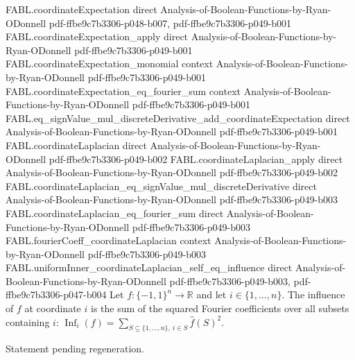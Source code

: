 \begin{theorem}
\proofstep
  {FABL.coordinateExpectation}
  {direct}
  {Analysis-of-Boolean-Functions-by-Ryan-ODonnell}
  {pdf-ffbe9c7b3306-p048-b007,
    pdf-ffbe9c7b3306-p049-b001}
\proofstep
  {FABL.coordinateExpectation_apply}
  {direct}
  {Analysis-of-Boolean-Functions-by-Ryan-ODonnell}
  {pdf-ffbe9c7b3306-p049-b001}
\proofstep
  {FABL.coordinateExpectation_monomial}
  {context}
  {Analysis-of-Boolean-Functions-by-Ryan-ODonnell}
  {pdf-ffbe9c7b3306-p049-b001}
\proofstep
  {FABL.coordinateExpectation_eq_fourier_sum}
  {context}
  {Analysis-of-Boolean-Functions-by-Ryan-ODonnell}
  {pdf-ffbe9c7b3306-p049-b001}
\proofstep
  {FABL.eq_signValue_mul_discreteDerivative_add_coordinateExpectation}
  {direct}
  {Analysis-of-Boolean-Functions-by-Ryan-ODonnell}
  {pdf-ffbe9c7b3306-p049-b001}
\proofstep
  {FABL.coordinateLaplacian}
  {direct}
  {Analysis-of-Boolean-Functions-by-Ryan-ODonnell}
  {pdf-ffbe9c7b3306-p049-b002}
\proofstep
  {FABL.coordinateLaplacian_apply}
  {direct}
  {Analysis-of-Boolean-Functions-by-Ryan-ODonnell}
  {pdf-ffbe9c7b3306-p049-b002}
\proofstep
  {FABL.coordinateLaplacian_eq_signValue_mul_discreteDerivative}
  {direct}
  {Analysis-of-Boolean-Functions-by-Ryan-ODonnell}
  {pdf-ffbe9c7b3306-p049-b003}
\proofstep
  {FABL.coordinateLaplacian_eq_fourier_sum}
  {direct}
  {Analysis-of-Boolean-Functions-by-Ryan-ODonnell}
  {pdf-ffbe9c7b3306-p049-b003}
\proofstep
  {FABL.fourierCoeff_coordinateLaplacian}
  {context}
  {Analysis-of-Boolean-Functions-by-Ryan-ODonnell}
  {pdf-ffbe9c7b3306-p049-b003}
\proofstep
  {FABL.uniformInner_coordinateLaplacian_self_eq_influence}
  {direct}
  {Analysis-of-Boolean-Functions-by-Ryan-ODonnell}
  {pdf-ffbe9c7b3306-p049-b003,
    pdf-ffbe9c7b3306-p047-b004}
Let $f:\{-1,1\}^n\to\mathbb{R}$ and let $i\in\{1,\ldots,n\}$. The influence of $f$ at
coordinate $i$ is the sum of the squared Fourier coefficients over all subsets
containing $i$: $\operatorname{Inf}_i(f)=\sum_{S\subseteq\{1,\ldots,n\},\ i\in
S}\widehat f(S)^2$.
\end{theorem}

\begin{theorem}
\label{FABL.mean_discreteDerivative_eq_fourierCoeff_singleton}
\leanok
{}
Statement pending regeneration.
\end{theorem}

